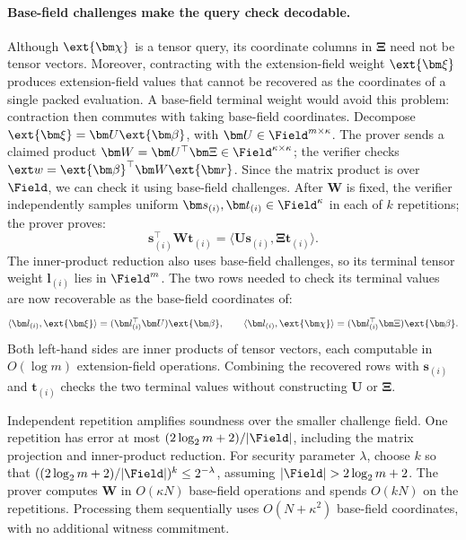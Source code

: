 \paragraph{Base-field challenges make the query check decodable.}
Although \(\ext{\bm\chi}\) is a tensor query, its coordinate columns
in \(\bm\Xi\) need not be tensor vectors.
Moreover, contracting with the extension-field weight
\(\ext{\bm\xi}\) produces extension-field values that cannot be
recovered as the coordinates of a single packed evaluation.
A base-field terminal weight would avoid this problem: contraction
then commutes with taking base-field coordinates.
Decompose \(\ext{\bm\xi}=\bm U\ext{\bm\beta}\), with
\(\bm U\in\Field^{m\times\kappa}\).
The prover sends a claimed product
\(\bm W=\bm U^\top\bm\Xi\in\Field^{\kappa\times\kappa}\);
the verifier checks \(\ext w=\ext{\bm\beta}^{\top}\bm W\ext{\bm r}\).
Since the matrix product is over \(\Field\), we can check it using
base-field challenges.
After \(\bm W\) is fixed, the verifier independently samples uniform
\(\bm s_{(i)},\bm t_{(i)}\in\Field^\kappa\) in each of \(k\)
repetitions; the prover proves:
\[
    \bm s_{(i)}^\top\bm W\bm t_{(i)}
    =\langle\bm U\bm s_{(i)},\bm\Xi\bm t_{(i)}\rangle.
\]
The inner-product reduction also uses base-field challenges, so its
terminal tensor weight \(\bm l_{(i)}\) lies in \(\Field^m\).
The two rows needed to check its terminal values are now recoverable
as the base-field coordinates of:
\[
    \langle\bm l_{(i)},\ext{\bm\xi}\rangle
       =(\bm l_{(i)}^\top\bm U)\ext{\bm\beta},
    \qquad
    \langle\bm l_{(i)},\ext{\bm\chi}\rangle
       =(\bm l_{(i)}^\top\bm\Xi)\ext{\bm\beta}.
\]
Both left-hand sides are inner products of tensor vectors, each
computable in \(O(\log m)\) extension-field operations.
Combining the recovered rows with \(\bm s_{(i)}\) and
\(\bm t_{(i)}\) checks the two terminal values without constructing
\(\bm U\) or \(\bm\Xi\).

Independent repetition amplifies soundness over the smaller challenge
field.
One repetition has error at most \((2\log_2m+2)/|\Field|\),
including the matrix projection and inner-product reduction.
For security parameter \(\lambda\), choose \(k\) so that
\(((2\log_2m+2)/|\Field|)^k\leq2^{-\lambda}\), assuming
\(|\Field|>2\log_2m+2\).
The prover computes \(\bm W\) in \(O(\kappa N)\) base-field operations
and spends \(O(kN)\) on the repetitions.
Processing them sequentially uses \(O(N+\kappa^2)\) base-field
coordinates, with no additional witness commitment.

